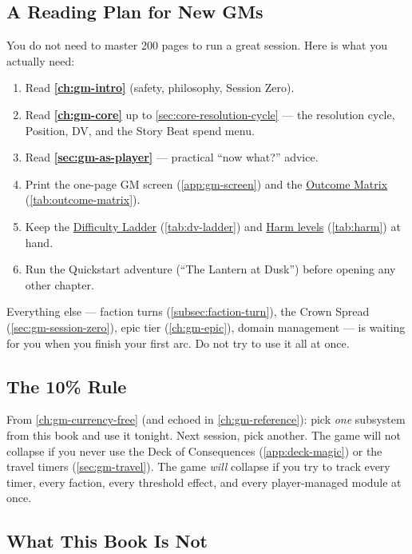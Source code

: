 \subsection*{A Reading Plan for New GMs}

You do not need to master 200 pages to run a great session. Here is what you actually need:

\begin{enumerate}
    \item Read \textbf{\autoref{ch:gm-intro}} (safety, philosophy, Session Zero).
    \item Read \textbf{\autoref{ch:gm-core}} up to \autoref{sec:core-resolution-cycle} --- the resolution cycle, Position, DV, and the Story Beat spend menu.
    \item Read \textbf{\autoref{sec:gm-as-player}} --- practical ``now what?'' advice.
    \item Print the one-page GM screen (\autoref{app:gm-screen}) and the \hyperref[tab:outcome-matrix]{Outcome Matrix} (\autoref{tab:outcome-matrix}).
    \item Keep the \hyperref[tab:dv-ladder]{Difficulty Ladder} (\autoref{tab:dv-ladder}) and \hyperref[tab:harm]{Harm levels} (\autoref{tab:harm}) at hand.
    \item Run the Quickstart adventure (``The Lantern at Dusk'') before opening any other chapter.
\end{enumerate}

Everything else --- faction turns (\autoref{subsec:faction-turn}), the Crown Spread (\autoref{sec:gm-session-zero}), epic tier (\autoref{ch:gm-epic}), domain management --- is waiting for you when you finish your first arc. Do not try to use it all at once.

\subsection*{The 10\% Rule}

From \autoref{ch:gm-currency-free} (and echoed in \autoref{ch:gm-reference}): pick \textit{one} subsystem from this book and use it tonight. Next session, pick another. The game will not collapse if you never use the Deck of Consequences (\autoref{app:deck-magic}) or the travel timers (\autoref{sec:gm-travel}). The game \textit{will} collapse if you try to track every timer, every faction, every threshold effect, and every player-managed module at once.

\subsection*{What This Book Is Not}

